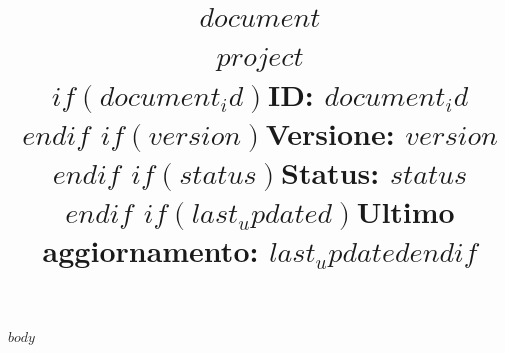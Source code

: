 \documentclass[11pt,a4paper]{article}
\title{%
  \vspace{-1cm}%
  {\color{bbccyan}\Huge\textbf{$document$}}\\[0.3cm]
  {\large\color{bbcgray}$project$}\\[0.2cm]
  $if(document_id)${\small\color{bbcgray}ID: \texttt{$document_id$}}\\$endif$
  $if(version)${\small\color{bbcgray}Versione: \textbf{$version$}}\\$endif$
  $if(status)${\small\color{bbcgray}Status: $status$}\\$endif$
  $if(last_updated)${\small\color{bbcgray}Ultimo aggiornamento: $last_updated$}$endif$
}
\date{}
\author{}
\begin{document}

\maketitle
\thispagestyle{fancy}

$body$
\end{document}
